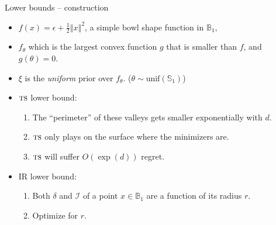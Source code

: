 \documentclass{beamer}
\newcommand{\ball}{\mathbb{B}}
\newcommand{\sphere}{\mathbb{S}}
\newcommand{\norm}[1]{\left \Vert  #1 \right \Vert}
\newcommand{\cI}{\mathcal{I}}
\newcommand{\ts}{{\textsc{ts}}}
\begin{document}
\begin{frame}{Lower bounds -- construction}
    \begin{itemize}
        \item $f(x)= \epsilon + \frac{1}{2} \norm{x}^2$, a simple bowl shape function in $\ball_1$,
        \item $f_\theta$ which is the largest convex function $g$ that is smaller than $f$, and $g(\theta) = 0$.
        \item $\xi$ is the \emph{uniform} prior over $f_\theta$. ($\theta \sim \text{unif}(\sphere_1)$)
    \end{itemize}
    \begin{itemize}
        \item $\ts$ lower bound:
              \begin{enumerate}
                  \item The ``perimeter'' of these valleys gets smaller exponentially with $d$.
                  \item $\ts$ only plays on the surface where the minimizers are.
                  \item $\ts$ will suffer $O(\exp(d))$ regret.
              \end{enumerate}
        \item IR lower bound:
              \begin{enumerate}
                  \item Both $\delta$ and $\cI$ of a point $x \in \ball_1$ are a function of its radius $r$.
                  \item Optimize for $r$.
              \end{enumerate}
    \end{itemize}
\end{frame}
\end{document}
